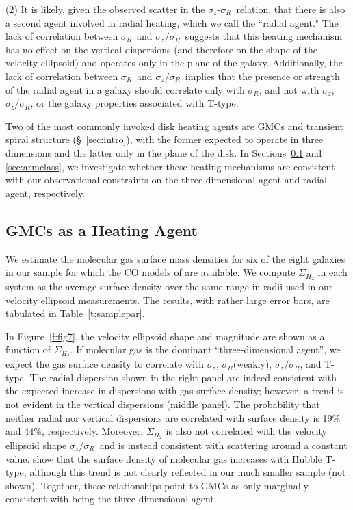 \documentclass[useAMS,usenatbib]{mn2e}
\newcommand{\sz}{$\sigma_z$}
\newcommand{\sr}{$\sigma_R$}
\newcommand{\szsr}{$\sigma_z/\sigma_R$}
\begin{document}
(2) It is likely, given the observed scatter in the \sz-\sr\ relation, that
there is also a second agent involved in radial heating, which we call
the ``radial agent."  The lack of correlation between \sr\ and
\szsr\ suggests that this heating mechanism has no effect on the vertical
dispersions (and therefore on the shape of the velocity ellipsoid) and
operates only in the plane of the galaxy.  Additionally, the lack of
correlation between \sr\ and \szsr\ implies that the presence or
strength of the radial agent in a galaxy should correlate only with \sr,
and not with \sz, \szsr, or the galaxy properties associated with
T-type.

Two of the most commonly invoked disk heating agents are GMCs and
transient spiral structure (\S~\ref{sec:intro}), with the former
expected to operate in three dimensions and the latter only in the plane
of the disk.  In Sections~\ref{sec:gmcs} and \ref{sec:armclass}, we
investigate whether these heating mechanisms are consistent with our
observational constraints on the three-dimensional agent and radial
agent, respectively.


\subsection{GMCs as a Heating Agent}
\label{sec:gmcs}

We estimate the molecular gas surface mass densities for six of the
eight galaxies in our sample for which the CO models of
\citet{Young1995} are available.  We compute $\Sigma_{H_2}$ in each
system as the average surface density over the same range in radii used
in our velocity ellipsoid measurements.  The results, with rather large
error bars, are tabulated in Table~\ref{t:samplepar}.

In Figure~\ref{f:fig7}, the velocity ellipsoid shape and magnitude are
shown as a function of $\Sigma_{H_2}$.  If molecular gas is the dominant
``three-dimensional agent'', we expect the gas surface density to
correlate with \sz, \sr (weakly), \szsr, and T-type.  The radial
dispersion shown in the right panel are indeed consistent with the
expected increase in dispersions with gas surface density; however, a
trend is not evident in the vertical dispersions (middle panel).
%
The probability that neither radial nor vertical dispersions are
correlated with surface density is 19\% and 44\%, respectively.
Moreover, $\Sigma_{H_2}$ is also not correlated with the velocity
ellipsoid shape \szsr\ and is instead consistent with scattering around
a constant value. 
\citealt{Roberts1994} show that the surface density of molecular gas
increases with Hubble T-type, although this trend is not clearly
reflected in our much smaller sample (not shown).  Together, these
relationships point to GMCs as only marginally consistent with being the
three-dimensional agent.
\end{document}
